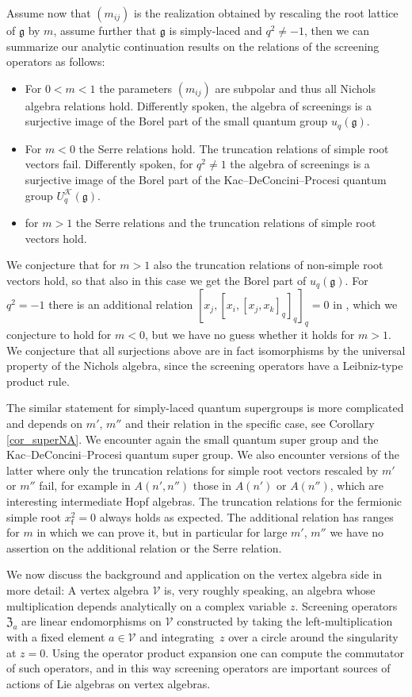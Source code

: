 \documentclass[pdftex]{sigma}%
\numberwithin{equation}{section}
\newcommand{\g}{\mathfrak{g}}
\newcommand{\zem}{\mathfrak{Z}}
\newcommand{\f}{\mathsf{f}}
\begin{document}
Assume now that $(m_{ij})$ is the realization obtained by rescaling the root lattice of $\g$ by $m$, assume further that $\g$ is simply-laced and $q^2\neq -1$, then we can summarize our analytic continuation results on the relations of the screening operators as follows:
\begin{itemize}\itemsep=0pt
		\item For $0<m<1$ the parameters $(m_{ij})$ are subpolar and thus all Nichols algebra relations hold. Differently spoken, the algebra of screenings is a surjective image of the Borel part of the small quantum group $u_q(\g)$.
		\item For $m<0$ the Serre relations hold. The truncation relations of simple root vectors fail. Differently spoken, for $q^2\neq 1$ the algebra of screenings is a surjective image of the Borel part of the Kac--DeConcini--Procesi quantum group $U_q^\mathcal{K}(\g)$.
		\item for $m>1$ the Serre relations and the truncation relations of simple root vectors hold.
	\end{itemize}
We conjecture that for $m>1$ also the truncation relations of non-simple root vectors hold, so that also in this case we get the Borel part of $u_q(\g)$. 	
	For $q^2=-1$ there is an additional relation $[x_j,[x_i,[x_j,x_k]_q]_q]_q=0$ in \cite{AA17}, which we conjecture to hold for $m<0$, but we have no guess whether it holds for $m>1$.	We conjecture that all surjections above are in fact isomorphisms by the universal property of the Nichols algebra, since the screening operators have a Leibniz-type product rule.
	
The similar statement for simply-laced quantum supergroups is more complicated and depends on $m'$, $m''$ and their relation in the specific case, see Corollary \ref{cor_superNA}. We encounter again the small quantum super group and the Kac--DeConcini--Procesi quantum super group. We also encounter versions of the latter where only the truncation relations for simple root vectors rescaled by $m'$ or $m''$ fail, for example in $A(n',n'')$ those in $A(n')$ or $A(n'')$, which are interesting intermediate Hopf algebras. The truncation relations for the fermionic simple root $x_\f^2=0$ always holds as expected. The additional relation has ranges for $m$ in which we can prove it, but in particular for large $m'$, $m''$ we have no assertion on the additional relation or the Serre relation.

We now discuss the background and application on the vertex algebra side in more detail: A vertex algebra $\mathcal{V}$ \cite{FBZ04, Kac98} is, very roughly speaking, an algebra whose multiplication depends analytically on a complex variable $z$.
Screening operators $\zem_a$ are linear endomorphisms on $\mathcal{V}$ constructed by taking the left-multiplication with a fixed element $a\in\mathcal{V}$ and integrating~$z$ over a circle around the singularity at $z=0$. Using the operator product expansion one can compute the commutator of such operators, and in this way screening operators are important sources of actions of Lie algebras on vertex algebras.
\end{document}
